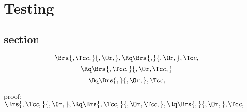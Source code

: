 \chapter{Testing}

\section{section}


\[\Brs{,\Tc c,}{,\Or,} , \Rq \Brs{,}{,\Or,},\Tc c,\]
\[\Rq \Brs{,\Tc c,}{,\Or,\Tc c,} \]
\[\Rq \Brs{,}{,\Or,} ,\Tc c,\]

\bigskip
proof:\\
\begin{math} 
 \Brs{,\Tc c,}{,\Or,} ,\\\\
\Rq \Brs{,\Tc c,}{,\Or,\Tc c,} , \\\\
\Rq \Brs{,}{,\Or,} ,\Tc c,
\end{math}
\bigskip